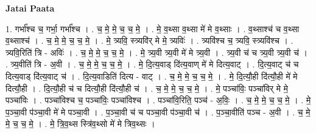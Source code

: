 \documentclass[17pt]{extarticle}
\begin{document}
\textbf{Jatai Paata} \newline

1. गर्भा᳚श्च च॒ गर्भा॒ गर्भा᳚श्च । . च॒ मे॒ मे॒ च॒ च॒ मे॒ । . मे॒ व॒थ्सा व॒थ्सा मे॑ मे व॒थ्साः । . व॒थ्साश्च॑ च व॒थ्सा व॒थ्साश्च॑ । . च॒ मे॒ मे॒ च॒ च॒ मे॒ । . मे॒ त्र्यवि॒ स्त्र्यवि॑र् मे मे॒ त्र्यविः॑ । . त्र्यवि॑श्च च॒ त्र्यवि॒ स्त्र्यवि॑श्च । . त्र्यवि॒रिति॑ त्रि - अविः॑ । . च॒ मे॒ मे॒ च॒ च॒ मे॒ । . मे॒ त्र्य॒वी त्र्य॒वी मे॑ मे त्र्य॒वी । . त्र्य॒वी च॑ च त्र्य॒वी त्र्य॒वी च॑ । . त्र्य॒वीति॑ त्रि - अ॒वी । . च॒ मे॒ मे॒ च॒ च॒ मे॒ । . मे॒ दि॒त्य॒वाड् दि॑त्य॒वाण् मे॑ मे दित्य॒वाट् । . दि॒त्य॒वाट् च॑ च दित्य॒वाड् दि॑त्य॒वाट् च॑ । . दि॒त्य॒वाडिति॑ दित्य - वाट् । . च॒ मे॒ मे॒ च॒ च॒ मे॒ । . मे॒ दि॒त्यौ॒ही दि॑त्यौ॒ही मे॑ मे दित्यौ॒ही । . दि॒त्यौ॒ही च॑ च दित्यौ॒ही दि॑त्यौ॒ही च॑ । . च॒ मे॒ मे॒ च॒ च॒ मे॒ । . मे॒ पञ्चा॑विः॒ पञ्चा॑विर् मे मे॒ पञ्चा॑विः । . पञ्चा॑विश्च च॒ पञ्चा॑विः॒ पञ्चा॑विश्च । . पञ्चा॑वि॒रिति॒ पञ्च॑ - अ॒विः॒ । . च॒ मे॒ मे॒ च॒ च॒ मे॒ । . मे॒ प॒ञ्चा॒वी प॑ञ्चा॒वी मे॑ मे पञ्चा॒वी । . प॒ञ्चा॒वी च॑ च पञ्चा॒वी प॑ञ्चा॒वी च॑ । . प॒ञ्चा॒वीति॑ पञ्च - अ॒वी । . च॒ मे॒ मे॒ च॒ च॒ मे॒ । . मे॒ त्रि॒व॒थ्स स्त्रि॑व॒थ्सो मे॑ मे त्रिव॒थ्सः । \newline
\end{document}
